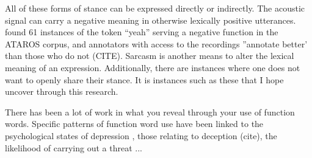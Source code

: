 All of these forms of stance can be expressed directly or indirectly.  The acoustic signal can carry a negative meaning in otherwise lexically positive utterances.  \cite{freeman2015prosody}  found 61 instances of the token ``yeah'' serving a negative function in the ATAROS corpus, and annotators with access to the recordings ''annotate better' than those who do not (CITE).  Sarcasm is another means to alter the lexical meaning of an expression.  Additionally, there are instances where one does not want to openly share their stance. It is instances such as these that I hope uncover through this research.  

There has been a lot of work in what you reveal through your use of function words.  Specific patterns of function word use have been linked to the psychological states of depression \citep{chung2007psychological}, those relating to deception (cite), the likelihood of carrying out a threat \citep{gales2017threatening}... 
%
%
%
 
